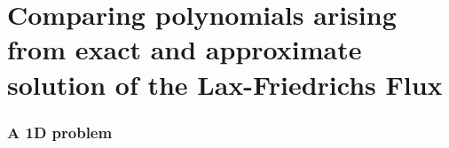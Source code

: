 \documentclass{beamer}
\renewcommand{\phi}{\varphi}
\begin{document}

\part{Comparing polynomials arising from exact and approximate solution of the Lax-Friedrichs Flux}
\label{part:polynomialstuff}

\section{A 1D problem}
\label{sec:interpretation-as-1d-problem}

\newcommand{\twopoints}[3]{
  \draw[fill=#3] (#1,#2) circle (0.05);
  \draw[xshift=0.1cm,yshift=0.1cm,fill=#3] (#1,#2) circle (0.05);
}
\end{document}
